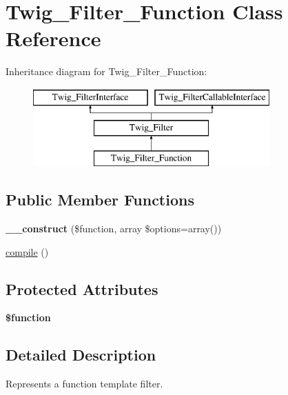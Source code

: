 \hypertarget{classTwig__Filter__Function}{}\section{Twig\+\_\+\+Filter\+\_\+\+Function Class Reference}
\label{classTwig__Filter__Function}
Inheritance diagram for Twig\+\_\+\+Filter\+\_\+\+Function\+:\begin{figure}[H]
\begin{center}
\leavevmode
\includegraphics[height=3.000000cm]{classTwig__Filter__Function}
\end{center}
\end{figure}
\subsection*{Public Member Functions}
\begin{DoxyCompactItemize}
\item 
{\bfseries \+\_\+\+\_\+construct} (\$function, array \$options=array())\hypertarget{classTwig__Filter__Function_a9fe23069e4711882f13015af0f3013ca}{}\label{classTwig__Filter__Function_a9fe23069e4711882f13015af0f3013ca}

\item 
\hyperlink{classTwig__Filter__Function_a66eb16cf1189e16bf1cd3818670f6f71}{compile} ()
\end{DoxyCompactItemize}
\subsection*{Protected Attributes}
\begin{DoxyCompactItemize}
\item 
{\bfseries \$function}\hypertarget{classTwig__Filter__Function_a217ac1c0c39acdfa88de19d3dc85c981}{}\label{classTwig__Filter__Function_a217ac1c0c39acdfa88de19d3dc85c981}

\end{DoxyCompactItemize}


\subsection{Detailed Description}
Represents a function template filter.

